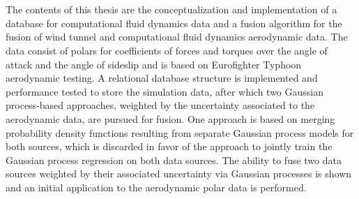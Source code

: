 \chapter{\abstractname}

The contents of this thesis are the conceptualization and implementation of a database for computational fluid dynamics data and a fusion algorithm for the fusion of wind tunnel and computational fluid dynamics aerodynamic data. The data consist of polars for coefficients of forces and torques over the angle of attack and the angle of sideslip and is based on Eurofighter Typhoon aerodynamic testing. A relational database structure is implemented and performance tested to store the simulation data, after which two Gaussian process-based approaches, weighted by the uncertainty associated to the aerodynamic data, are pursued for fusion. One approach is based on merging probability density functions resulting from separate Gaussian process models for both sources, which is discarded in favor of the approach to jointly train the Gaussian process regression on both data sources. The ability to fuse two data sources weighted by their associated uncertainty via Gaussian processes is shown and an initial application to the aerodynamic polar data is performed.


\makeatletter
{}
{\renewcommand{\abstractname}{Kurzfassung}}
{\renewcommand{\abstractname}{Abstract}}
\makeatother
